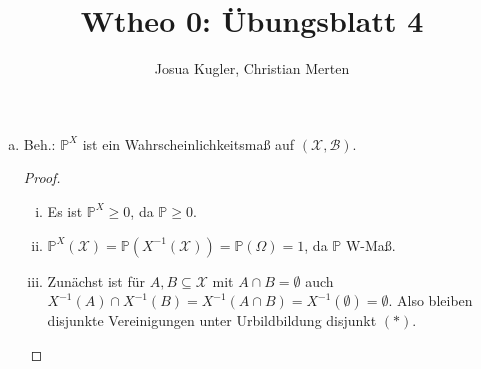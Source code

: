 \documentclass[uebung]{lecture}
\title{Wtheo 0: Übungsblatt 4}
\author{Josua Kugler, Christian Merten}
\begin{document}
\punkte[13]

\begin{aufgabe}
    \begin{enumerate}[(a)]
        \item Beh.: $\mathbb{P}^{X}$ ist ein Wahrscheinlichkeitsmaß auf $(\mathcal{X}, \mathscr{B})$.
            \begin{proof}
                \begin{enumerate}[(i)]
                    \item Es ist $\mathbb{P}^{X} \ge 0$, da $\mathbb{P} \ge 0$.
                    \item $\mathbb{P}^{X}(\mathcal{X}) = \mathbb{P}(X^{-1}(\mathcal{X})) = \mathbb{P}(\Omega) = 1$, da $\mathbb{P}$ W-Maß.
                    \item Zunächst ist für $A, B \subseteq \mathcal{X}$ mit $A \cap B = \emptyset$ auch $X^{-1}(A) \cap X^{-1}(B) =X^{-1}(A \cap B) = X^{-1}(\emptyset) = \emptyset$.
                        Also bleiben disjunkte Vereinigungen unter Urbildbildung disjunkt $(*)$.


\end{enumerate}
\end{proof}
\end{enumerate}
\end{aufgabe}
\end{document}
